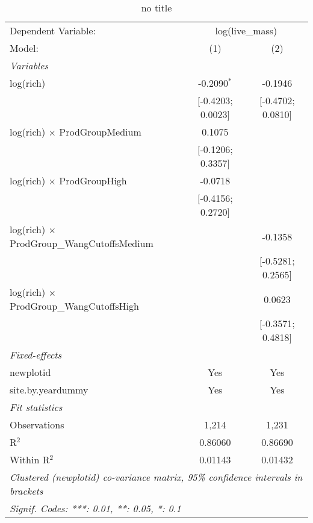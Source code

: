 
\begin{table}[htbp]
   \caption{no title}
   \centering
   \begin{tabular}{lcc}
      \tabularnewline \midrule \midrule
      Dependent Variable: & \multicolumn{2}{c}{log(live\_mass)}\\
      Model:                                            & (1)               & (2)\\  
      \midrule
      \emph{Variables}\\
      log(rich)                                         & -0.2090$^{*}$     & -0.1946\\   
                                                        & [-0.4203; 0.0023] & [-0.4702; 0.0810]\\   
      log(rich) $\times$ ProdGroupMedium                & 0.1075            &   \\   
                                                        & [-0.1206; 0.3357] &   \\   
      log(rich) $\times$ ProdGroupHigh                  & -0.0718           &   \\   
                                                        & [-0.4156; 0.2720] &   \\   
      log(rich) $\times$ ProdGroup\_WangCutoffsMedium   &                   & -0.1358\\   
                                                        &                   & [-0.5281; 0.2565]\\   
      log(rich) $\times$ ProdGroup\_WangCutoffsHigh     &                   & 0.0623\\   
                                                        &                   & [-0.3571; 0.4818]\\   
      \midrule
      \emph{Fixed-effects}\\
      newplotid                                         & Yes               & Yes\\  
      site.by.yeardummy                                 & Yes               & Yes\\  
      \midrule
      \emph{Fit statistics}\\
      Observations                                      & 1,214             & 1,231\\  
      R$^2$                                             & 0.86060           & 0.86690\\  
      Within R$^2$                                      & 0.01143           & 0.01432\\  
      \midrule \midrule
      \multicolumn{3}{l}{\emph{Clustered (newplotid) co-variance matrix, 95\% confidence intervals in brackets}}\\
      \multicolumn{3}{l}{\emph{Signif. Codes: ***: 0.01, **: 0.05, *: 0.1}}\\
   \end{tabular}
\end{table}



